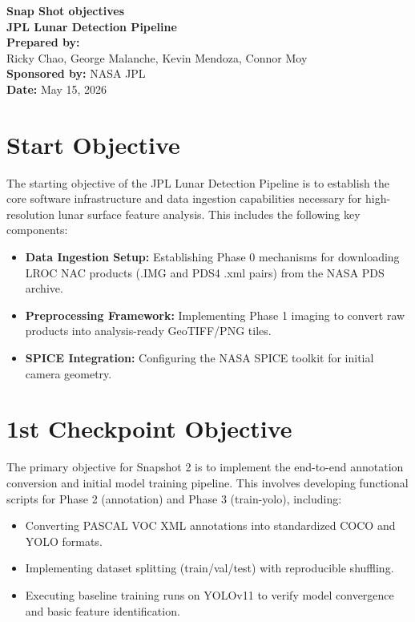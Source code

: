 \documentclass[11pt]{article}
\begin{document}
\begin{titlepage}
    \centering
    \vspace*{2cm}
    {\Huge \textbf{Snap Shot objectives}} \\
    \vspace{0.5cm}
    {\Large \textbf{JPL Lunar Detection Pipeline}} \\
    \vfill
    \textbf{Prepared by:} \\
     Ricky Chao, George Malanche, Kevin Mendoza, Connor Moy \\
    \vspace{1cm}
    \textbf{Sponsored by:} NASA JPL \\
    \textbf{Date:} May 15, 2026
\end{titlepage}

\section*{Start Objective}
The starting objective of the JPL Lunar Detection Pipeline is to establish the core software infrastructure and data ingestion capabilities necessary for high-resolution lunar surface feature analysis. This includes the following key components:

\begin{itemize}
    \item \textbf{Data Ingestion Setup:} Establishing Phase 0 mechanisms for downloading LROC NAC products (.IMG and PDS4 .xml pairs) from the NASA PDS archive.
    \item \textbf{Preprocessing Framework:} Implementing Phase 1 imaging to convert raw products into analysis-ready GeoTIFF/PNG tiles.
    \item \textbf{SPICE Integration:} Configuring the NASA SPICE toolkit for initial camera geometry.
\end{itemize}

\section*{1st Checkpoint Objective}
The primary objective for Snapshot 2 is to implement the end-to-end annotation conversion and initial model training pipeline. This involves developing functional scripts for Phase 2 (annotation) and Phase 3 (train-yolo), including:
\begin{itemize}
    \item Converting PASCAL VOC XML annotations into standardized COCO and YOLO formats.
    \item Implementing dataset splitting (train/val/test) with reproducible shuffling.
    \item Executing baseline training runs on YOLOv11 to verify model convergence and basic feature identification.
\end{itemize}
\end{document}
